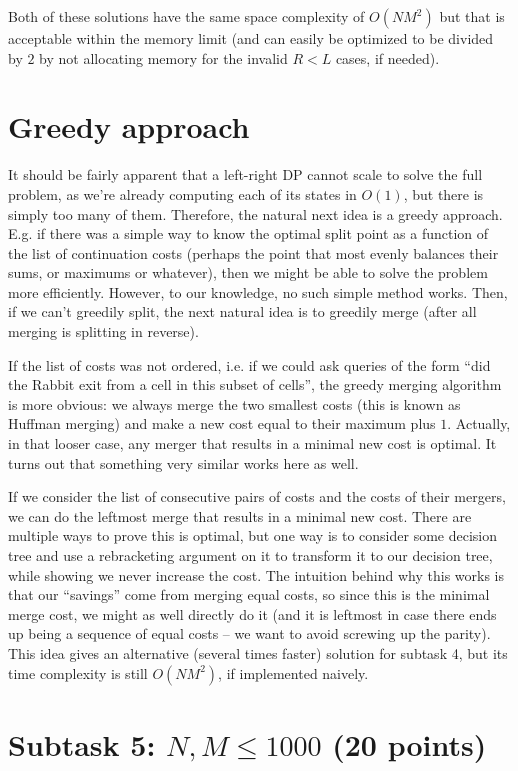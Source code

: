 \documentclass[12pt]{article}
\begin{document}
Both of these solutions have the same space complexity of $O(NM^2)$ but that is acceptable within the memory limit (and can easily be optimized to be divided by $2$ by not allocating memory for the invalid $R < L$ cases, if needed).

\section*{Greedy approach}

It should be fairly apparent that a left-right DP cannot scale to solve the full problem, as we're already computing each of its states in $O(1)$, but there is simply too many of them. Therefore, the natural next idea is a greedy approach. E.g. if there was a simple way to know the optimal split point as a function of the list of continuation costs (perhaps the point that most evenly balances their sums, or maximums or whatever), then we might be able to solve the problem more efficiently. However, to our knowledge, no such simple method works. Then, if we can't greedily split, the next natural idea is to greedily merge (after all merging is splitting in reverse).

If the list of costs was not ordered, i.e. if we could ask queries of the form ``did the Rabbit exit from a cell in this subset of cells'', the greedy merging algorithm is more obvious: we always merge the two smallest costs (this is known as Huffman merging) and make a new cost equal to their maximum plus $1$. Actually, in that looser case, any merger that results in a minimal new cost is optimal. It turns out that something very similar works here as well.

If we consider the list of consecutive pairs of costs and the costs of their mergers, we can do the leftmost merge that results in a minimal new cost. There are multiple ways to prove this is optimal, but one way is to consider some decision tree and use a rebracketing argument on it to transform it to our decision tree, while showing we never increase the cost. The intuition behind why this works is that our ``savings'' come from merging equal costs, so since this is the minimal merge cost, we might as well directly do it (and it is leftmost in case there ends up being a sequence of equal costs -- we want to avoid screwing up the parity). This idea gives an alternative (several times faster) solution for subtask 4, but its time complexity is still $O(NM^2)$, if implemented naively.

\section*{Subtask 5: $N, M \leq 1000$ (20 points)}
\end{document}
